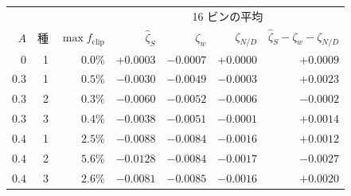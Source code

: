 \begin{tabular}{rrrrrrr}
\toprule
& & & \multicolumn{4}{c}{16 ビンの平均} \\
$A$ & 種 & $\max f_{\mathrm{clip}}$ & $\hat\zeta_S$ & $\zeta_w$ & $\zeta_{N/D}$ & $\hat\zeta_S - \zeta_w - \zeta_{N/D}$ \\
\midrule
$0$ & 1 & $0.0\%$ & $+0.0003$ & $-0.0007$ & $+0.0000$ & $+0.0009$ \\
$0.3$ & 1 & $0.5\%$ & $-0.0030$ & $-0.0049$ & $-0.0003$ & $+0.0023$ \\
$0.3$ & 2 & $0.3\%$ & $-0.0060$ & $-0.0052$ & $-0.0006$ & $-0.0002$ \\
$0.3$ & 3 & $0.4\%$ & $-0.0038$ & $-0.0051$ & $-0.0001$ & $+0.0014$ \\
$0.4$ & 1 & $2.5\%$ & $-0.0088$ & $-0.0084$ & $-0.0016$ & $+0.0012$ \\
$0.4$ & 2 & $5.6\%$ & $-0.0128$ & $-0.0084$ & $-0.0017$ & $-0.0027$ \\
$0.4$ & 3 & $2.6\%$ & $-0.0081$ & $-0.0085$ & $-0.0016$ & $+0.0020$ \\
\bottomrule
\end{tabular}
